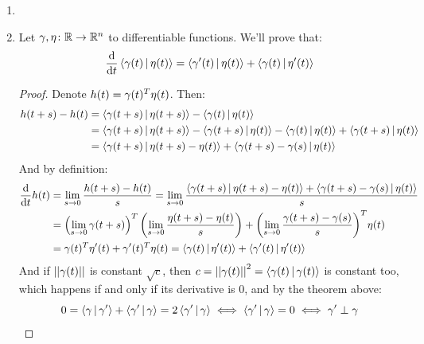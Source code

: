 \documentclass[a4paper]{article}
\begin{document}
	\section{}
	\begin{enumerate}
		\item 
		\item Let $\cg, \eta \co \R \to \R^{n}$ to differentiable functions. We'll prove that: 
		\[ \frac{\dd}{\dd t}\mut{\cg(t)}{\eta(t)} = \mut{\cg'(t)}{\eta(t)} + \mut{\cg(t)}{\eta'(t)} \]\begin{proof}
			
			Denote $h(t) = \cg(t)^T\eta(t)$. Then: 
			\begin{align*}
				{h(t + s) - h(t)} &= {\mut{\cg(t + s)}{\eta(t + s)} - \mut{\cg(t)}{\eta(t)}} \\
				&= {\mut{\cg(t + s)}{\eta(t + s)} - \mut{\cg( t + s)}{\eta(t)} - \mut{\cg(t)}{\eta(t)}} + \mut{\cg( t + s)}{\eta(t)} \\
				&= \mut{\cg(t + s)}{\eta(t + s) - \eta(t)} + \mut{\cg(t + s) - \cg(s)}{\eta(t)}
			\end{align*}
			And by definition: 
			\begin{align*}
				\frac{\dd}{\dd t}h(t) &= \lim_{s \to 0} \frac{h(t + s) -h(t)}{s} = \lim_{s \to 0} \frac{\mut{\cg(t + s)}{\eta(t + s) - \eta(t)} + \mut{\cg(t + s) - \cg(s)}{\eta(t)}}{s} \\
				&= \cl{\lim_{s \to 0}\cg(t + s)}^T \cl{\lim_{s \to 0} \frac{{}{\eta(t + s) - \eta(t)}}{s}} + \cl{\lim_{s \to 0} \frac{{\cg(t + s) - \cg(s)}{}}{s}}^T\!\eta(t) \\
				&= \cg(t)^T\eta'(t) + \cg'(t)^T\eta(t) = { \mut{\cg(t)}{\eta'(t)} + \mut{\cg'(t)}{\eta'(t)}}
			\end{align*}
			And if $\norm{\cg(t)} $ is constant $\sqrt c$, then $c = \norm{\cg(t)}^2 = \mut{\cg(t)}{\cg(t)}$ is constant too, which happens if and only if its derivative is $0$, and by the theorem above: 
			\[ 0 = \mut{\cg}{\cg'} + \mut{\cg'}{\cg} = 2\mut{\cg'}{\cg} \iff \mut{\cg'}{\cg} = 0 \iff \cg' \perp \cg \]
		\end{proof}
		

\end{enumerate}
\end{document}
